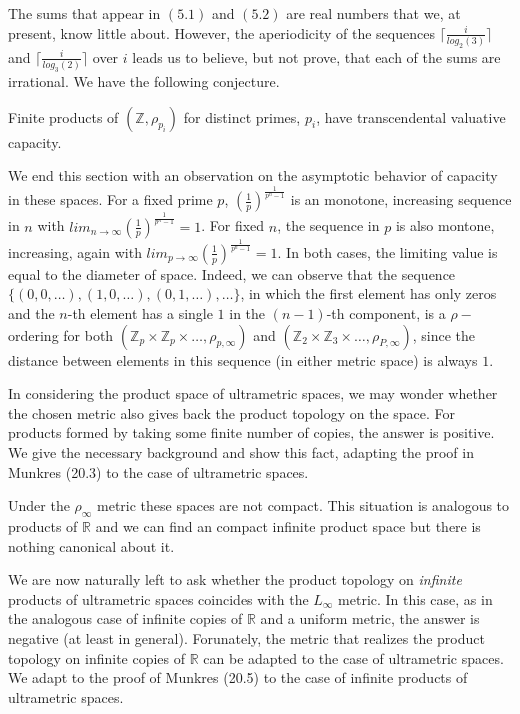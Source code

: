 The sums that appear in $(5.1)$ and $(5.2)$ are real numbers that we, at present, know  little about. However, the aperiodicity of the sequences $\lceil\frac{i}{log_2(3)}\rceil$ and $\lceil\frac{i}{log_3(2)}\rceil$ over $i$ leads us to believe, but not prove, that each of the sums are irrational. We have the following conjecture.\\

\begin{conjecture} Finite products of $(\mathbb{Z}, \rho_{p_i})$ for distinct primes, $p_i$, have transcendental valuative capacity. \end{conjecture}
 
We end this section with an observation on the asymptotic behavior of capacity in these spaces. For a fixed prime $p$,  $(\frac{1}{p})^{\frac{1}{p^n-1}}$ is an monotone, increasing sequence in $n$ with $ lim_{n\to\infty} (\frac{1}{p})^{\frac{1}{p^n-1}} =  1$. For fixed $n$, the sequence in $p$ is also montone, increasing, again with  $ lim_{p\to\infty} (\frac{1}{p})^{\frac{1}{p^n-1}}=1$. In both cases, the limiting value is equal to the diameter of space. Indeed, we can observe that the sequence $\{(0,0,\ldots), (1,0,\ldots), (0,1,\ldots), \ldots\}$, in which the first element has only zeros and the $n$-th element has a single $1$ in the $(n-1)$-th component, is a $\rho-$ordering for both  $(\mathbb{Z}_p \times \mathbb{Z}_p \times \ldots, \rho_{p,\infty})$  and  $(\mathbb{Z}_2 \times \mathbb{Z}_3 \times \ldots, \rho_{P,\infty})$, since the distance between elements in this sequence (in either metric space) is always $1$. 

In considering the product space of ultrametric spaces, we may wonder whether the chosen metric also gives back the product topology on the space.  For products formed by taking some finite number of copies, the answer is positive. We give the necessary background and show this fact, adapting the proof in Munkres (20.3) to the case of ultrametric spaces. 

Under the $\rho_\infty$ metric these spaces are not compact. This situation is analogous to products of $\mathbb{R}$ and we can find an compact infinite product space but there is nothing canonical about it. 


We are now naturally left to ask whether the product topology on \textit{infinite} products of ultrametric spaces coincides with the $L_\infty$ metric. In this case, as in the analogous case of infinite copies of $\mathbb{R}$ and a uniform metric, the answer is negative (at least in general). Forunately, the metric that realizes the product topology on infinite copies of $\mathbb{R}$ can be adapted to the case of ultrametric spaces. We adapt to the proof of Munkres (20.5) to the case of infinite products of ultrametric spaces.

